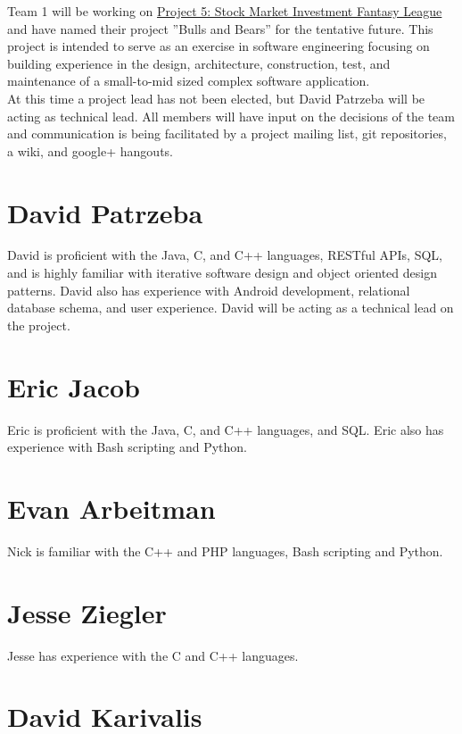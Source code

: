 \documentclass[11pt,letterpaper,oneside]{memoir}
\begin{document}
Team 1 will be working on \href{http://ece.rutgers.edu/~marsic/books/SE/projects/}
{Project 5: Stock Market Investment Fantasy League} and have named their project
''Bulls and Bears'' for the tentative future. This project is intended to serve
as an exercise in software engineering focusing on building experience in the design,
architecture, construction, test, and maintenance of a small-to-mid sized complex
software application.\\

At this time a project lead has not been elected, but David Patrzeba will be acting
as technical lead.  All members will have input on the decisions of the team and
communication is being facilitated by a project mailing list, git repositories,
a wiki, and google+ hangouts.\\

\section{David Patrzeba}

David is proficient with the Java, C, and C++ languages, RESTful APIs, SQL, and is
highly familiar with iterative software design and object oriented design patterns.
David also has experience with Android development, relational database schema, and
user experience.  David will be acting as a technical lead on the project.

\section{Eric Jacob}

Eric is proficient with the Java, C, and C++ languages, and SQL.  Eric also has
experience with Bash scripting and Python.

\section{Evan Arbeitman}

Nick is familiar with the C++ and PHP languages, Bash scripting and Python.

\section{Jesse Ziegler}

Jesse has experience with the C and C++ languages.

\section{David Karivalis}
\end{document}
